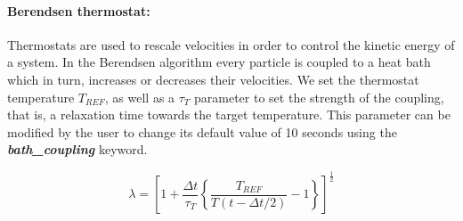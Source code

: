 \documentclass[a4paper,10pt]{article}
\begin{document}
\paragraph{Berendsen thermostat:}
Thermostats are  used to  rescale velocities in  order to  control the
kinetic energy of a system.  In the Berendsen algorithm every particle
is coupled to a heat bath  which in turn, increases or decreases their
velocities.  We set the thermostat temperature $T_{REF}$, as well as a
$\tau_{T}$ parameter to  set the strength of the coupling,  that is, a
relaxation time towards the target temperature.  This parameter can be
modified by the  user to change its default value  of 10 seconds using
the \textbf{\textit{bath\_coupling}} keyword.



\begin{equation}
\lambda = \left[ 1 + \frac{\Delta t}{\tau_{T}} \left\{ \frac{T_{REF}}{T(t-\Delta t/2)} -1 \right\} \right]^{\frac{1}{2}}
\end{equation}  









\end{document}
